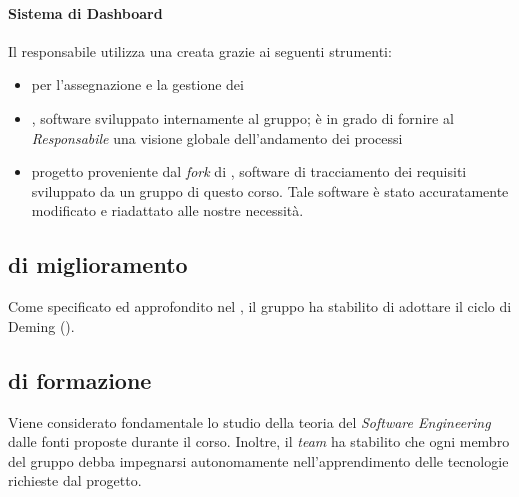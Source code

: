 \paragraph*{Sistema di Dashboard}Il responsabile utilizza una  creata grazie ai seguenti strumenti:
\begin{itemize}

\item {} per l'assegnazione e la gestione dei 
\item {}, software sviluppato internamente al gruppo; è in grado di fornire al \textit{Responsabile} una visione globale dell'andamento dei processi
\item {} progetto proveniente dal \textit{fork} di , software di tracciamento dei requisiti sviluppato da un gruppo di questo corso. Tale software è stato accuratamente modificato e riadattato alle nostre necessità.
\end{itemize}

\subsection{ di miglioramento}

Come specificato ed approfondito nel \PianoDiQualifica, il gruppo ha stabilito di adottare il ciclo di Deming ().

\subsection{ di formazione}

Viene considerato fondamentale lo studio della teoria del \textit{Software Engineering} dalle fonti proposte durante il corso.
Inoltre, il \textit{team} ha stabilito che ogni membro del gruppo debba impegnarsi autonomamente nell'apprendimento delle tecnologie richieste dal progetto.

